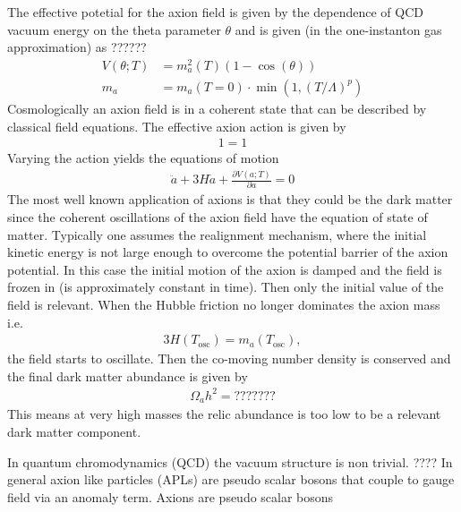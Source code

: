\documentclass[13pt,a4paper,twoside,titlepage]{article}
\begin{document}
The effective potetial for the axion field is given by the dependence of QCD vacuum energy
on the theta parameter $\theta$ and is given (in the one-instanton gas approximation) as ??????
\begin{align}
    V(\theta; T) &= m_a^2(T) (1 - \cos(\theta)) \\
    m_a &= m_a(T = 0) \cdot \min\left(1, \left( T / \Lambda \right)^p \right)
\end{align}
Cosmologically an axion field is in a coherent state that can be described by classical field equations.
The effective axion action is given by
\begin{align}
    1 = 1
\end{align}
Varying the action yields the equations of motion
\begin{align}
    \ddot{a} + 3 H \dot{a} + \frac{\partial V(a; T)}{\partial a} = 0
\end{align}
The most well known application of axions is that they could be the dark matter since
the coherent oscillations of the axion field have the equation of state of matter.
Typically one assumes the realignment mechanism, where the initial kinetic energy is not large enough to overcome the potential barrier of the axion potential. In this case the initial motion of the axion is damped and the field is frozen in (is approximately constant in time). Then only the initial value of the field is relevant.
When the Hubble friction no longer dominates the axion mass i.e.
\begin{align}
    3H(T_\mathrm{osc}) = m_a(T_\mathrm{osc}),
\end{align}
the field starts to oscillate.
Then the co-moving number density is conserved and the final dark matter abundance is given by
\begin{align}
    \Omega_a h^2 = ???????
\end{align}
This means at very high masses the relic abundance is too low to be a relevant dark matter component.

In quantum chromodynamics (QCD) the vacuum structure is non trivial.
????
In general axion like particles (APLs) are pseudo scalar bosons that couple
to gauge field via an anomaly term.
Axions are pseudo scalar bosons


\end{document}
